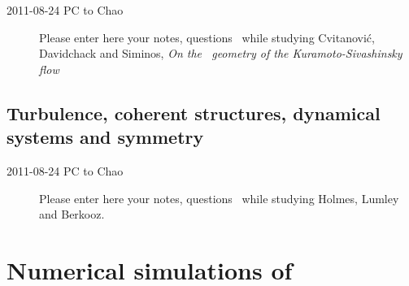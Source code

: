 \begin{description}

\item[2011-08-24 PC to Chao]
Please enter here your notes, questions \etc\ while studying
Cvitanovi{\'c}, Davidchack and Siminos,
\emph{On the \statesp\ geometry of the {Kuramoto-Sivashinsky} flow}

\end{description}

\subsection{Turbulence, coherent structures, dynamical systems and
symmetry}
\label{s:Holmes96}

\begin{description}

\item[2011-08-24 PC to Chao]
Please enter here your notes, questions \etc\ while studying
Holmes, Lumley and Berkooz.

\end{description}

\section{Numerical simulations of \KSe}
\label{s:KSnumerical}


